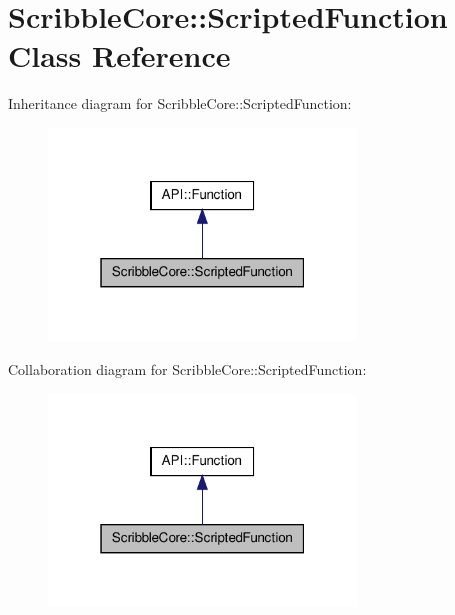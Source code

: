 \hypertarget{class_scribble_core_1_1_scripted_function}{\section{Scribble\-Core\-:\-:Scripted\-Function Class Reference}
\label{class_scribble_core_1_1_scripted_function}
}


Inheritance diagram for Scribble\-Core\-:\-:Scripted\-Function\-:
\nopagebreak
\begin{figure}[H]
\begin{center}
\leavevmode
\includegraphics[width=232pt]{class_scribble_core_1_1_scripted_function__inherit__graph}
\end{center}
\end{figure}


Collaboration diagram for Scribble\-Core\-:\-:Scripted\-Function\-:
\nopagebreak
\begin{figure}[H]
\begin{center}
\leavevmode
\includegraphics[width=232pt]{class_scribble_core_1_1_scripted_function__coll__graph}
\end{center}
\end{figure}
